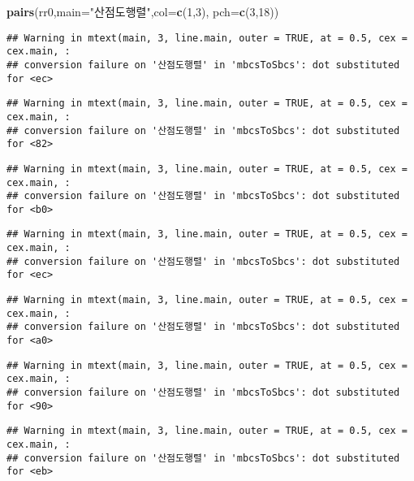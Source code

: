 \documentclass[
]{article}
\newenvironment{Shaded}{\begin{snugshade}}{\end{snugshade}}
\newcommand{\AttributeTok}[1]{\textcolor[rgb]{0.13,0.29,0.53}{#1}}
\newcommand{\DecValTok}[1]{\textcolor[rgb]{0.00,0.00,0.81}{#1}}
\newcommand{\FunctionTok}[1]{\textcolor[rgb]{0.13,0.29,0.53}{\textbf{#1}}}
\newcommand{\NormalTok}[1]{#1}
\newcommand{\StringTok}[1]{\textcolor[rgb]{0.31,0.60,0.02}{#1}}
\begin{document}
\begin{Shaded}
\begin{Highlighting}[]
\FunctionTok{pairs}\NormalTok{(rr0,}\AttributeTok{main=}\StringTok{"산점도행렬"}\NormalTok{,}\AttributeTok{col=}\FunctionTok{c}\NormalTok{(}\DecValTok{1}\NormalTok{,}\DecValTok{3}\NormalTok{), }\AttributeTok{pch=}\FunctionTok{c}\NormalTok{(}\DecValTok{3}\NormalTok{,}\DecValTok{18}\NormalTok{))}
\end{Highlighting}
\end{Shaded}

\begin{verbatim}
## Warning in mtext(main, 3, line.main, outer = TRUE, at = 0.5, cex = cex.main, :
## conversion failure on '산점도행렬' in 'mbcsToSbcs': dot substituted for <ec>
\end{verbatim}

\begin{verbatim}
## Warning in mtext(main, 3, line.main, outer = TRUE, at = 0.5, cex = cex.main, :
## conversion failure on '산점도행렬' in 'mbcsToSbcs': dot substituted for <82>
\end{verbatim}

\begin{verbatim}
## Warning in mtext(main, 3, line.main, outer = TRUE, at = 0.5, cex = cex.main, :
## conversion failure on '산점도행렬' in 'mbcsToSbcs': dot substituted for <b0>
\end{verbatim}

\begin{verbatim}
## Warning in mtext(main, 3, line.main, outer = TRUE, at = 0.5, cex = cex.main, :
## conversion failure on '산점도행렬' in 'mbcsToSbcs': dot substituted for <ec>
\end{verbatim}

\begin{verbatim}
## Warning in mtext(main, 3, line.main, outer = TRUE, at = 0.5, cex = cex.main, :
## conversion failure on '산점도행렬' in 'mbcsToSbcs': dot substituted for <a0>
\end{verbatim}

\begin{verbatim}
## Warning in mtext(main, 3, line.main, outer = TRUE, at = 0.5, cex = cex.main, :
## conversion failure on '산점도행렬' in 'mbcsToSbcs': dot substituted for <90>
\end{verbatim}

\begin{verbatim}
## Warning in mtext(main, 3, line.main, outer = TRUE, at = 0.5, cex = cex.main, :
## conversion failure on '산점도행렬' in 'mbcsToSbcs': dot substituted for <eb>
\end{verbatim}
\end{document}
